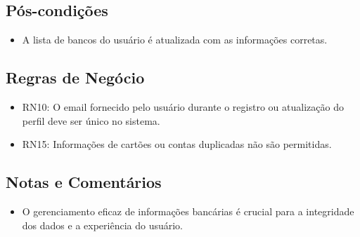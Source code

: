 \subsection*{Pós-condições}
\begin{addmargin}[1.5cm]{0cm}
	\begin{itemize}
		\item A lista de bancos do usuário é atualizada com as informações corretas.
	\end{itemize}
\end{addmargin}

\subsection*{Regras de Negócio}
\begin{addmargin}[1.5cm]{0cm}
	\begin{itemize}
		\item RN10: O email fornecido pelo usuário durante o registro ou atualização do perfil deve ser único no sistema.
		\item RN15: Informações de cartões ou contas duplicadas não são permitidas.
	\end{itemize}
\end{addmargin}

\subsection*{Notas e Comentários}
\begin{addmargin}[1.5cm]{0cm}
	\begin{itemize}
		\item O gerenciamento eficaz de informações bancárias é crucial para a integridade dos dados e a experiência do usuário.
	\end{itemize}
\end{addmargin}
